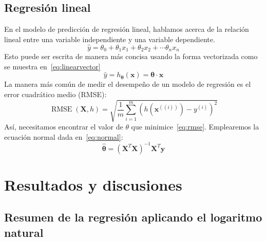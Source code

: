 \documentclass{sciposter}
\begin{document}
\begin{multicols*}{2}
\subsection*{Regresión lineal}
En el modelo de predicción de regresión lineal, hablamos acerca de la relación lineal entre una variable independiente y una variable dependiente.
\begin{equation}\label{eq:linear}
\hat{y}=\theta_{0}+\theta_{1}x_{1}+\theta_{2}x_{2}+\cdots\theta_{n}x_{n}
\end{equation}
Esto puede ser escrita de manera más concisa usando la forma vectorizada como se muestra en~\eqref{eq:linearvector}
\begin{equation}\label{eq:linearvector}
\hat{y}=h_{\bm{\theta}}\left(\bm{x}\right)=\bm{\theta}\cdot\bm{x}
\end{equation}
La manera más común de medir el desempeño de un modelo de regresión es el error cuadrático medio (RMSE):
\begin{equation}\label{eq:rmse}
\operatorname{RMSE}\left(\bm{X},h\right)=\sqrt{\frac{1}{m}\sum_{i=1}^{m}{\left(h\left(\bm{x}^{\left((i)\right)}\right)-y^{\left(i\right)}\right)}^{2}}
\end{equation}
Así, necesitamos encontrar el valor de $\theta$ que minimice~\eqref{eq:rmse}. Emplearemos la ecuación normal dada en~\eqref{eq:normal}:
\begin{equation}\label{eq:normal}
\hat{\bm{\theta}}={\left(\bm{X}^{T}\bm{X}\right)}^{-1}\bm{X}^{T}\bm{y}
\end{equation}
\section{Resultados y discusiones}
\subsection*{Resumen de la regresión aplicando el logaritmo natural}



\end{multicols*}
\end{document}
